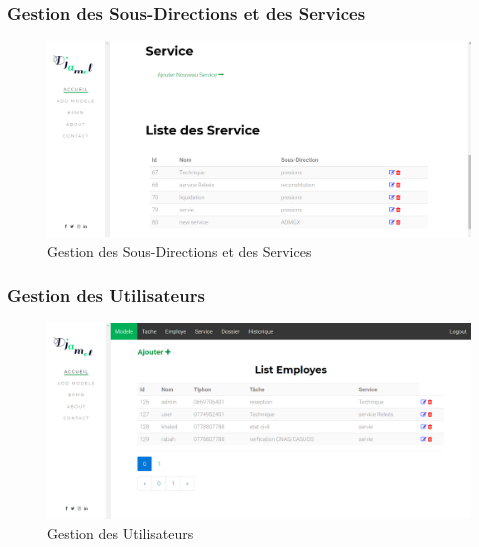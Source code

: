 \subsubsection{Gestion des  Sous-Directions et des Services }
\begin{figure}[H]
	\centering
	\includegraphics[width=1\linewidth]{images/captures/capturesadmin/service}
	\caption{Gestion des  Sous-Directions et des Services}
	\label{fig:service}
\end{figure}


 
 \subsubsection{Gestion des  Utilisateurs}
\begin{figure}[H]
	\centering
	\includegraphics[width=1\linewidth]{images/captures/capturesadmin/user}
	\caption{Gestion des  Utilisateurs}
	\label{fig:user}
\end{figure}




